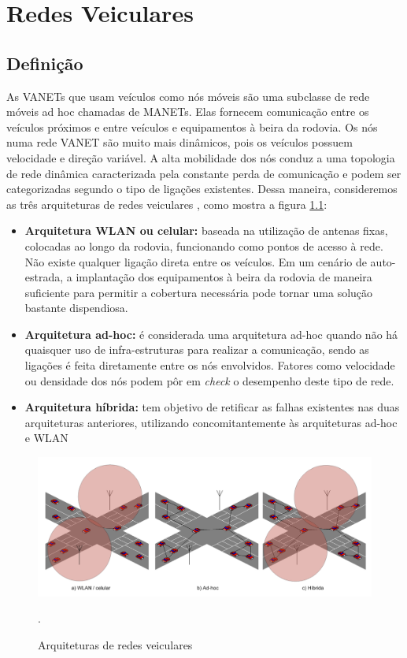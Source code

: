 \documentclass[
	12pt,				%
	oneside,			%
	a4paper,			%
	english,			%
	brazil				%
	]{abntex2ppgsi}
\begin{document}
\chapter{Redes Veiculares}

\section{Definição}

As VANETs que usam veículos como nós móveis são uma subclasse de rede móveis ad hoc chamadas de MANETs. Elas fornecem comunicação entre os veículos próximos e entre veículos e equipamentos à beira da rodovia. Os nós numa rede VANET são muito mais dinâmicos, pois os veículos possuem velocidade e direção variável. A alta mobilidade dos nós conduz a uma topologia de rede dinâmica caracterizada pela constante perda de comunicação \cite{bubenikova2014security} \cite{jakubiak2008state} e podem ser categorizadas segundo o tipo de ligações existentes. Dessa maneira, consideremos as três arquiteturas de redes veiculares \cite{luis2009melhoria}, como mostra a figura \ref{fig:arquiteturas_vanets}: 


\begin{itemize}
	\item{\textbf{Arquitetura WLAN ou celular:} baseada na utilização de antenas fixas, colocadas ao longo da rodovia, funcionando como pontos de acesso à rede. Não existe qualquer ligação direta entre os veículos. Em um cenário de auto-estrada, a implantação dos equipamentos à beira da rodovia de maneira suficiente para permitir a cobertura necessária pode tornar uma solução bastante dispendiosa.}	
	\item{\textbf{Arquitetura ad-hoc:} é considerada uma arquitetura ad-hoc quando não há quaisquer uso de infra-estruturas para realizar a comunicação, sendo as ligações é feita diretamente entre os nós envolvidos. Fatores como velocidade ou densidade dos nós podem pôr em \textit{check} o desempenho deste tipo de rede.}	
	\item{\textbf{Arquitetura híbrida: } tem objetivo de retificar as falhas existentes nas duas arquiteturas anteriores, utilizando concomitantemente às arquiteturas ad-hoc e WLAN}	
\end{itemize} 


\begin{figure}[h!]
	\centering
	\includegraphics[width=0.8\columnwidth]{images/tipos_arquiteturas_vanets}
	\caption{Arquiteturas de redes veiculares\cite{luis2009melhoria}}.
	\label{fig:arquiteturas_vanets}
\end{figure}
\end{document}
